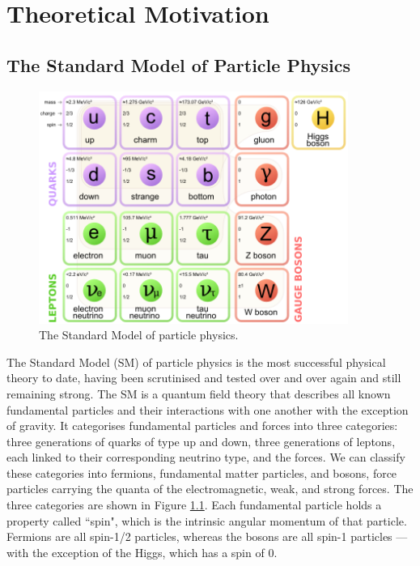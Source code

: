 \chapter{Theoretical Motivation} \label{chap-theory}


\section{The Standard Model of Particle Physics} \label{sec-StandardModel}

\begin{figure}
\begin{center}
\includegraphics[width=0.9\textwidth]{Figures/StandardModel.png}
\end{center}
\caption{The Standard Model of particle physics.}
\label{fig-SM}
\end{figure}

The Standard Model (SM) of particle physics is the most successful physical theory to date, having been scrutinised and tested over and over 
again and still remaining strong. The SM is a quantum field theory that describes all known fundamental particles and their interactions with 
one another with the exception of gravity. It categorises fundamental particles and forces into three categories: three generations of quarks 
of type up and down, three generations of leptons, each linked to their corresponding neutrino type, and the forces. We can classify these 
categories into fermions, fundamental matter particles, and bosons, force particles carrying the quanta of the electromagnetic, weak, and 
strong forces. The three categories are shown in Figure \ref{fig-SM}. Each fundamental particle holds a property called ``spin", which is the intrinsic angular momentum of that particle. Fermions are all spin-1/2 particles, whereas the bosons are all spin-1 particles --- with the exception of the Higgs, which has a spin of 0.


